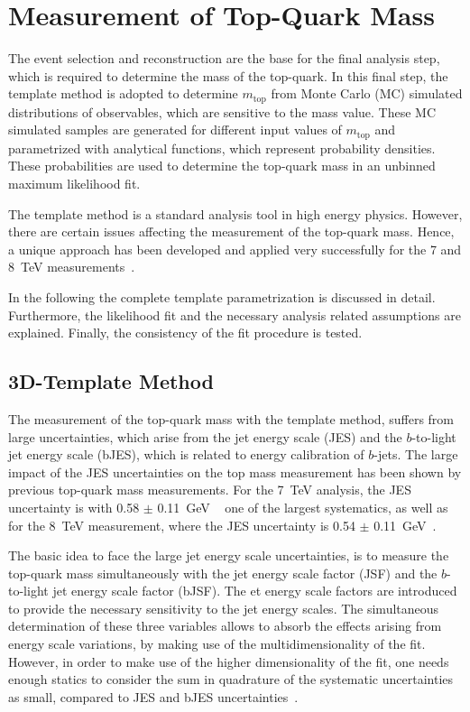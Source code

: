 \chapter{Measurement of Top-Quark Mass}
\label{sec:Temp1}

The event selection and \rm reconstruction are the base for the final analysis step, which is required to determine the mass of the top-quark. In this final step, the template method  is adopted to determine $m_{\text{top}}$  from Monte Carlo (MC) simulated distributions of observables, which are sensitive to the mass value. These MC simulated samples are generated for different input values of $m_{\text{top}}$ and parametrized with analytical functions, which represent probability densities. These probabilities are used to determine the top-quark mass in an unbinned maximum likelihood fit.

 The template method is a standard analysis tool in high energy physics. However, there are certain issues affecting the measurement of the top-quark mass.  Hence, a unique approach has been developed and applied very successfully for the 7 and 8~TeV measurements~\cite{Aad:2015nba,ATLAS-CONF-2017-071}.

In the following the complete template parametrization is discussed in detail. Furthermore, the likelihood fit and the necessary analysis related assumptions are explained. Finally, the consistency of the fit procedure is tested. 


\section{3D-Template Method}
The measurement of the top-quark mass with the template method, suffers from large uncertainties, which arise from the jet energy scale (JES) and the $b$-to-light jet energy scale (bJES), which is related to energy calibration of $b$-jets. The large impact of the JES uncertainties on the top mass measurement has been shown by previous top-quark mass measurements. For  the 7~TeV analysis, the JES uncertainty is with 0.58 $ \pm $ 0.11~GeV ~\cite{Aad:2015nba} one of the largest systematics, as well as for  the 8~TeV measurement, where the JES uncertainty is 0.54 $\pm$ 0.11~GeV~\cite{ATLAS-CONF-2017-071}.

 The basic idea to face the large jet energy scale uncertainties, is to measure the top-quark mass simultaneously with the jet energy scale factor (JSF) and the $b$-to-light jet energy scale factor (bJSF). The et energy scale factors are introduced to provide the necessary sensitivity to the jet energy scales. The simultaneous determination of these three variables allows to absorb the effects arising from energy scale variations, by making use of the multidimensionality of the fit. 
However, in order to make use of the higher dimensionality of the fit, one needs enough statics to consider the sum in quadrature of the systematic uncertainties as small, compared to JES and bJES uncertainties~\cite{ATLAS-CONF-2017-071}. 




